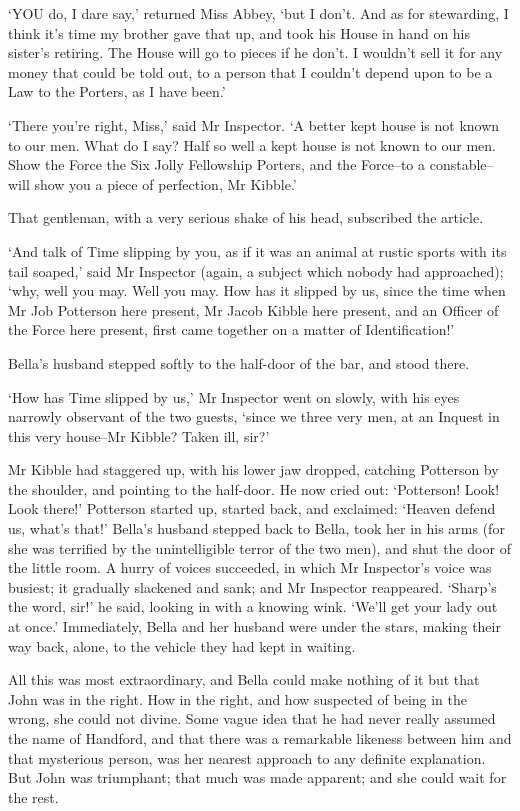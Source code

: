 ‘YOU do, I dare say,’ returned Miss Abbey, ‘but I don’t. And as for
stewarding, I think it’s time my brother gave that up, and took his
House in hand on his sister’s retiring. The House will go to pieces if
he don’t. I wouldn’t sell it for any money that could be told out, to a
person that I couldn’t depend upon to be a Law to the Porters, as I have
been.’

‘There you’re right, Miss,’ said Mr Inspector. ‘A better kept house is
not known to our men. What do I say? Half so well a kept house is not
known to our men. Show the Force the Six Jolly Fellowship Porters,
and the Force--to a constable--will show you a piece of perfection, Mr
Kibble.’

That gentleman, with a very serious shake of his head, subscribed the
article.

‘And talk of Time slipping by you, as if it was an animal at rustic
sports with its tail soaped,’ said Mr Inspector (again, a subject which
nobody had approached); ‘why, well you may. Well you may. How has it
slipped by us, since the time when Mr Job Potterson here present, Mr
Jacob Kibble here present, and an Officer of the Force here present,
first came together on a matter of Identification!’

Bella’s husband stepped softly to the half-door of the bar, and stood
there.

‘How has Time slipped by us,’ Mr Inspector went on slowly, with his eyes
narrowly observant of the two guests, ‘since we three very men, at an
Inquest in this very house--Mr Kibble? Taken ill, sir?’

Mr Kibble had staggered up, with his lower jaw dropped, catching
Potterson by the shoulder, and pointing to the half-door. He now cried
out: ‘Potterson! Look! Look there!’ Potterson started up, started back,
and exclaimed: ‘Heaven defend us, what’s that!’ Bella’s husband stepped
back to Bella, took her in his arms (for she was terrified by the
unintelligible terror of the two men), and shut the door of the little
room. A hurry of voices succeeded, in which Mr Inspector’s voice was
busiest; it gradually slackened and sank; and Mr Inspector reappeared.
‘Sharp’s the word, sir!’ he said, looking in with a knowing wink. ‘We’ll
get your lady out at once.’ Immediately, Bella and her husband were
under the stars, making their way back, alone, to the vehicle they had
kept in waiting.

All this was most extraordinary, and Bella could make nothing of it but
that John was in the right. How in the right, and how suspected of being
in the wrong, she could not divine. Some vague idea that he had never
really assumed the name of Handford, and that there was a remarkable
likeness between him and that mysterious person, was her nearest
approach to any definite explanation. But John was triumphant; that much
was made apparent; and she could wait for the rest.

